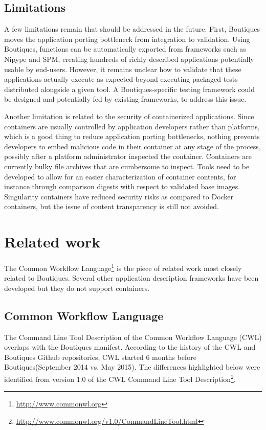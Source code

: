 \documentclass{article}
\newcommand{\boutiques}{Boutiques\xspace}
\begin{document}
\subsection{Limitations}

A few limitations remain that should be addressed in the
future. First, \boutiques moves the application porting bottleneck
from integration to validation. Using \boutiques, functions can be
automatically exported from frameworks such as Nipype and SPM,
creating hundreds of richly described applications potentially usable
by end-users. However, it remains unclear how to validate that these
applications actually execute as expected beyond executing packaged tests
distributed alongside a given tool. A \boutiques-specific testing
framework could be designed and potentially fed by existing frameworks,
to address this issue.

Another limitation is related to the security of containerized
applications. Since containers are usually controlled by application
developers rather than platforms, which is a good thing to reduce
application porting bottlenecks, nothing prevents developers to embed
malicious code in their container at any stage of the process,
possibly after a platform administrator inspected the
container. Containers are currently bulky file archives that are
cumbersome to inspect. Tools need to be developed to allow for an
easier characterization of container contents, for instance through
comparison digests with respect to validated base images. Singularity
containers have reduced security risks as compared to Docker containers,
but the issue of content transparency is still not avoided.


\section{Related work}

The Common Workflow Language\footnote{\url{http://www.commonwl.org}}
is the piece of related work most closely related to
\boutiques. Several other application description frameworks have been
developed but they do not support containers.

\subsection{Common Workflow Language}

The Command Line Tool Description of the Common Workflow Language
(CWL) overlaps with the \boutiques manifest. According to the history
of the CWL and \boutiques Github repositories, CWL started 6 months
before \boutiques (September 2014 vs. May 2015). The differences
highlighted below were identified from version 1.0 of the CWL Command
Line Tool
Description\footnote{\url{http://www.commonwl.org/v1.0/CommandLineTool.html}}.
\end{document}
